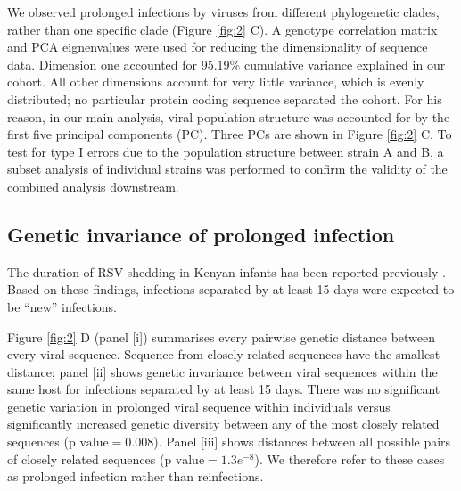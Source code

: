 \documentclass{article} %
\begin{document}
We observed prolonged infections by viruses from different phylogenetic clades, rather than one specific clade 
(Figure \ref{fig:2} C).
A genotype correlation matrix and PCA eignenvalues were used for reducing the dimensionality of sequence data.
Dimension one accounted for 95.19\% cumulative variance explained in our cohort.
All other dimensions account for very little variance, which is evenly distributed; no particular protein coding sequence separated the cohort.
For his reason, in our main analysis, viral population structure was accounted for by the first five principal components (PC). 
Three PCs are shown in Figure \ref{fig:2} C.
To test for type I errors due to the population structure between strain A and B, 
a subset analysis of individual strains was performed to confirm the validity of the combined analysis downstream.


\subsection{Genetic invariance of prolonged infection}
The duration of RSV shedding in Kenyan infants has been reported previously
\citep{okiro2010duration}.
Based on these findings, infections separated by at least 15 days were expected to be ``new'' infections. 

Figure \ref{fig:2} D (panel [i]) summarises every pairwise genetic distance between every viral sequence.
Sequence from closely related sequences have the smallest distance; panel [ii] shows genetic invariance between viral sequences within the same host for infections separated by at least 15 days. 
There was no significant genetic variation in prolonged viral sequence within individuals versus significantly increased genetic diversity between any of the most closely related sequences ($\text{p value} = 0.008$).
Panel [iii] shows distances between all possible pairs of closely related sequences ($\text{p value} = 1.3e^{-8}$).
We therefore refer to these cases as prolonged infection rather than reinfections.
\end{document}
